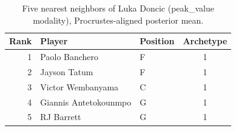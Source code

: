 \begin{table}[htbp]
  \centering\small
  \begin{tabular}{rllc}
    \toprule
    Rank & Player & Position & Archetype \\
    \midrule
    1 & Paolo Banchero & F & 1 \\
    2 & Jayson Tatum & F & 1 \\
    3 & Victor Wembanyama & C & 1 \\
    4 & Giannis Antetokounmpo & G & 1 \\
    5 & RJ Barrett & G & 1 \\
    \bottomrule
  \end{tabular}
  \caption{Five nearest neighbors of Luka Doncic (peak_value modality), Procrustes-aligned posterior mean.}
  \label{tab:Luka_Doncic_neighbors_peak_value}
\end{table}

